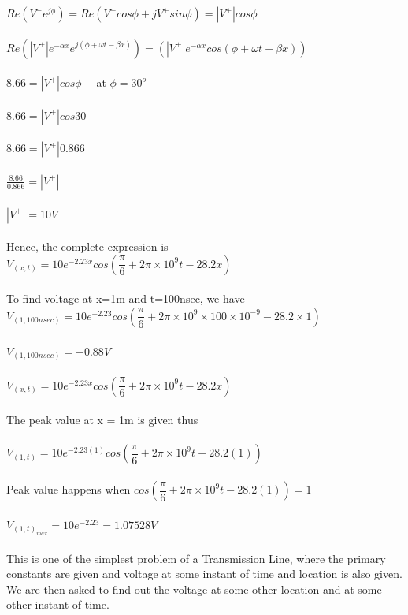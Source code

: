 $Re({V^{+}e^{j\phi}}) = Re({V^{+}{cos\phi}} + {jV^{+}{sin\phi}}) = |V^{+}|{cos\phi}$\\\\
$Re({|V^{+}|e^{-\alpha x}e^{j(\phi+\omega t - \beta x)}}) = ({|V^{+}|e^{-\alpha x}cos{(\phi+\omega t - \beta x)}})$\\\\
$8.66 = {|V^+|{cos\phi}} \quad$ at $ \phi = 30^{o} $\\\\
$8.66 = {|V^+|{cos30}}$\\\\
$8.66 = {|V^+|{0.866}}$\\\\
$\frac{8.66}{0.866} = {|V^+|}$\\\\
${|V^{+}| = 10V}$\\\\
Hence, the complete expression is\\
$V_({x,t}) = 10e^{-2.23x} cos({\dfrac{\pi}{6} + 2\pi\times10^9t - 28.2x})$\\\\
To find voltage at x=1m and t=100nsec, we have\\
$V_({1,100nsec}) = 10e^{-2.23} cos({\dfrac{\pi}{6} + 2\pi\times10^9\times100\times10^{-9} - 28.2\times1})$\\\\
$V_({1,100nsec}) = -0.88V$\\\\
$V_({x,t}) = 10e^{-2.23x} cos({\dfrac{\pi}{6} + 2\pi\times10^9t - 28.2x})$\\\\
The peak value at x = 1m is given thus\\\\
$V_({1,t}) = 10e^{-2.23(1)} cos({\dfrac{\pi}{6} + 2\pi\times10^9t - 28.2(1)})$\\\\
Peak value happens when $cos({\dfrac{\pi}{6} + 2\pi\times10^9t - 28.2(1)}) = 1$\\\\
$ V_{(1,t)_{max}} = 10e^{-2.23} = 1.07528V $\\\\
This is one of the simplest problem of a Transmission Line, where the primary constants are given and voltage at some instant of time and location is also given. We are then asked to find out the voltage at some other location and at some other instant of time.\\
